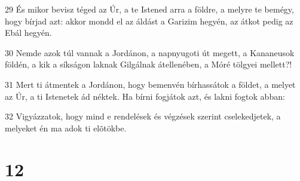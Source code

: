 \par 29 És mikor bevisz téged az Úr, a te Istened arra a földre, a melyre te bemégy, hogy bírjad azt: akkor mondd el az áldást a Garizim hegyén, az átkot pedig az Ebál hegyén.
\par 30 Nemde azok túl vannak a Jordánon, a napnyugoti út megett, a Kananeusok földén, a kik a síkságon laknak Gilgálnak átellenében, a Móré tölgyei mellett?!
\par 31 Mert ti átmentek a Jordánon, hogy bemenvén bírhassátok a földet, a melyet az Úr, a ti Istenetek ád néktek. Ha bírni fogjátok azt, és lakni fogtok abban:
\par 32 Vigyázzatok, hogy mind e rendelések és végzések szerint cselekedjetek, a melyeket én ma adok ti elõtökbe.

\chapter{12}

